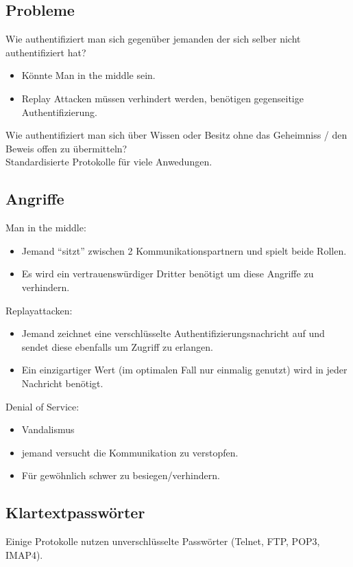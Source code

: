 \documentclass{article} %
\begin{document}
\subsection{Probleme}
Wie authentifiziert man sich gegenüber jemanden der sich selber nicht authentifiziert hat?
\begin{itemize}
	\item Könnte Man in the middle sein.
    \item Replay Attacken müssen verhindert werden, benötigen gegenseitige Authentifizierung.
\end{itemize}
Wie authentifiziert man sich über Wissen oder Besitz ohne das Geheimniss / den Beweis offen zu übermitteln?\\
Standardisierte Protokolle für viele Anwedungen.
\subsection{Angriffe}
Man in the middle:
\begin{itemize}
	\item Jemand "`sitzt"' zwischen 2 Kommunikationspartnern und spielt beide Rollen.
    \item Es wird ein vertrauenswürdiger Dritter benötigt um diese Angriffe zu verhindern.
\end{itemize}
Replayattacken:
\begin{itemize}
	\item Jemand zeichnet eine verschlüsselte Authentifizierungsnachricht auf und sendet diese ebenfalls um Zugriff zu erlangen.
    \item Ein einzigartiger Wert (im optimalen Fall nur einmalig genutzt) wird in jeder Nachricht benötigt.
\end{itemize}
Denial of Service:
\begin{itemize}
	\item Vandalismus
    \item jemand versucht die Kommunikation zu verstopfen.
    \item Für gewöhnlich schwer zu besiegen/verhindern.
\end{itemize}
\subsection{Klartextpasswörter}
Einige Protokolle nutzen unverschlüsselte Passwörter (Telnet, FTP, POP3, IMAP4).
\end{document}
